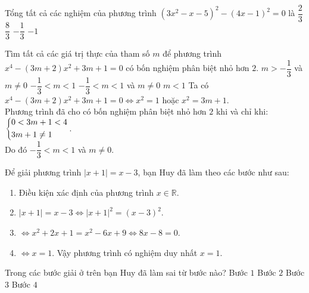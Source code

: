 \begin{bt}
	Tổng tất cả các nghiệm của phương trình $\left(3x^2-x-5\right)^2-\left(4x-1\right)^2=0$ là
	\choice
	{\True $\dfrac{2}{3}$}
	{$\dfrac{8}{3}$}
	{$-\dfrac{1}{3}$}
	{$-1$}
\end{bt}
\begin{bt}
	Tìm tất cả các giá trị thực của tham số $m$ để phương trình $x^4 -(3m+2)x^2+3m+1=0$ có bốn nghiệm phân biệt nhỏ hơn $2$.
	\choice
	{$m> -\dfrac{1}{3} ${ và }$ m \neq 0$}
	{$-\dfrac{1}{3} < m < 1$}
	{\True $-\dfrac{1}{3} < m < 1$ {và} $m \neq 0$}
	{$m<1$}
	\loigiai 
	{ Ta có $x^4 -(3m+2)x^2+3m+1=0 \Leftrightarrow x^2=1$ hoặc $x^2=3m+1$.\\
		Phương trình đã cho có bốn nghiệm phân biệt nhỏ hơn $2$ khi và chỉ khi:$\left\{\begin{aligned}&0<3m+1<4\\ &3m+1\neq1\end{aligned}\right.$.\\
		Do đó $-\dfrac{1}{3} < m < 1$ và $m \neq 0$.}
\end{bt}
\begin{bt}
	Để giải phương trình $|x+1|=x-3$, bạn Huy đã làm theo các bước như sau:
	\begin{enumerate}
		\item Điều kiện xác định của phương trình $x\in\mathbb{R}$.
		\item  $|x+1|=x-3\Leftrightarrow |x+1|^2=(x-3)^2$.
		\item $\Leftrightarrow x^2+2x+1=x^2-6x+9\Leftrightarrow 8x-8=0$.
		\item $\Leftrightarrow x=1$. Vậy phương trình có nghiệm duy nhất $x=1$.
	\end{enumerate}
	Trong các bước giải ở trên bạn Huy đã làm sai từ bước nào?
	\choice
	{Bước $1$}
	{\True Bước $2$}
	{Bước $3$}
	{Bước $4$}
\end{bt}
